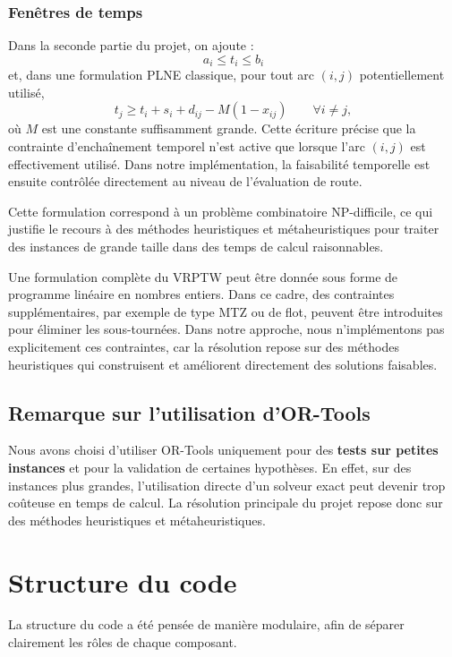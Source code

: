 \documentclass[11pt,a4paper]{article}
\begin{document}
\subsubsection{Fenêtres de temps}
Dans la seconde partie du projet, on ajoute :
\[
a_i \le t_i \le b_i
\]
et, dans une formulation PLNE classique, pour tout arc \((i,j)\) potentiellement utilisé,
\[
t_j \ge t_i + s_i + d_{ij} - M(1-x_{ij}) \qquad \forall i \neq j,
\]
où \(M\) est une constante suffisamment grande. Cette écriture précise que la contrainte d'enchaînement temporel n'est active que lorsque l'arc \((i,j)\) est effectivement utilisé. Dans notre implémentation, la faisabilité temporelle est ensuite contrôlée directement au niveau de l'évaluation de route.

Cette formulation correspond à un problème combinatoire NP-difficile, ce qui justifie le recours à des méthodes heuristiques et métaheuristiques pour traiter des instances de grande taille dans des temps de calcul raisonnables.

Une formulation complète du VRPTW peut être donnée sous forme de programme linéaire en nombres entiers. Dans ce cadre, des contraintes supplémentaires, par exemple de type MTZ ou de flot, peuvent être introduites pour éliminer les sous-tournées. Dans notre approche, nous n'implémentons pas explicitement ces contraintes, car la résolution repose sur des méthodes heuristiques qui construisent et améliorent directement des solutions faisables.

\subsection{Remarque sur l'utilisation d'OR-Tools}
Nous avons choisi d'utiliser OR-Tools uniquement pour des \textbf{tests sur petites instances} et pour la validation de certaines hypothèses. En effet, sur des instances plus grandes, l'utilisation directe d'un solveur exact peut devenir trop coûteuse en temps de calcul. La résolution principale du projet repose donc sur des méthodes heuristiques et métaheuristiques.

\section{Structure du code}

La structure du code a été pensée de manière modulaire, afin de séparer clairement les rôles de chaque composant.
\end{document}

